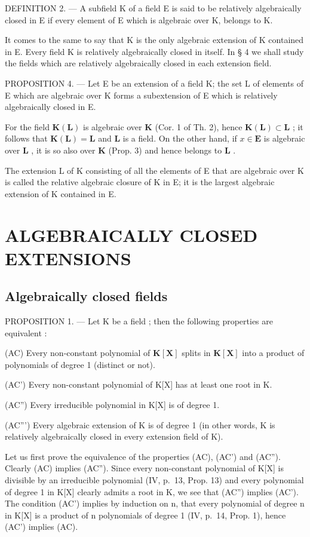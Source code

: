 DEFINITION 2. --- A subfield K of a field E is said to be relatively algebraically closed in E if every element of E which is algebraic over K, belongs to K.

It comes to the same to say that K is the only algebraic extension of K contained in E. Every field K is relatively algebraically closed in itself. In § 4 we shall study the fields which are relatively algebraically closed in each extension field.

PROPOSITION 4. --- Let E be an extension of a field K; the set L of elements of E which are algebraic over K forms a subextension of E which is relatively algebraically closed in E.

For the field \(\mathbf{K}(\mathbf{L})\) is algebraic over \(\mathbf{K}\) (Cor. 1 of Th. 2), hence \(\mathbf{K}(\mathbf{L}) \subset \mathbf{L}\) ; it follows that \(\mathbf{K}(\mathbf{L}) = \mathbf{L}\) and \(\mathbf{L}\) is a field. On the other hand, if \(x \in \mathbf{E}\) is algebraic over \(\mathbf{L}\) , it is so also over \(\mathbf{K}\) (Prop. 3) and hence belongs to \(\mathbf{L}\) .

The extension L of K consisting of all the elements of E that are algebraic over K is called the relative algebraic closure of K in E; it is the largest algebraic extension of K contained in E.

\section{ALGEBRAICALLY CLOSED EXTENSIONS}

\subsection{Algebraically closed fields}

PROPOSITION 1. --- Let K be a field ; then the following properties are equivalent :

(AC) Every non-constant polynomial of \(\mathbf{K}[\mathbf{X}]\) splits in \(\mathbf{K}[\mathbf{X}]\) into a product of polynomials of degree 1 (distinct or not).

(AC') Every non-constant polynomial of K{[}X{]} has at least one root in K.

(AC'') Every irreducible polynomial in K{[}X{]} is of degree 1.

(AC''') Every algebraic extension of K is of degree 1 (in other words, K is relatively algebraically closed in every extension field of K).

Let us first prove the equivalence of the properties (AC), (AC') and (AC''). Clearly (AC) implies (AC''). Since every non-constant polynomial of K{[}X{]} is divisible by an irreducible polynomial (IV, p.~13, Prop. 13) and every polynomial of degree 1 in K{[}X{]} clearly admits a root in K, we see that (AC'') implies (AC'). The condition (AC') implies by induction on n, that every polynomial of degree n in K{[}X{]} is a product of n polynomials of degree 1 (IV, p.~14, Prop. 1), hence (AC') implies (AC).


